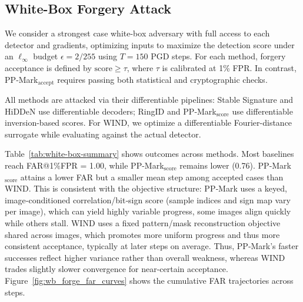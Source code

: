 \documentclass{article}
\theoremstyle{plain}
\theoremstyle{definition}
\theoremstyle{remark}
\begin{document}
\subsection{White-Box Forgery Attack}
We consider a strongest case white-box adversary with full access to each detector and
gradients, optimizing inputs to maximize the detection score under an $\ell_\infty$ budget $\epsilon=2/255$ using $T=150$ PGD steps. For each method, forgery acceptance is defined by $\mathrm{score}\ge\tau$, where $\tau$ is calibrated at 1\% FPR. In contrast, PP‑Mark$_{\mathrm{accept}}$ requires passing both statistical and cryptographic checks. 

All methods are attacked via their differentiable pipelines: Stable Signature and HiDDeN use differentiable decoders; RingID and PP‑Mark$_{\mathrm{score}}$ use differentiable inversion-based scores. For WIND, we optimize a differentiable Fourier-distance surrogate while evaluating against the actual detector. 

Table~\ref{tab:white-box-summary} shows outcomes across methods. Most baselines reach FAR@1\%FPR = 1.00, while PP-Mark$_{\mathrm{score}}$ remains lower (0.76).  PP‑Mark$_{\mathrm{score}}$ attains a lower FAR but a smaller mean step among accepted cases
than WIND. This is consistent with the objective structure: PP‑Mark uses a keyed, image‑conditioned correlation/bit‑sign score (sample indices and sign map vary per image), which can yield highly variable progress, some images align quickly while others stall. WIND uses a fixed pattern/mask reconstruction objective shared across images, which promotes more uniform progress and thus more consistent acceptance, typically at later steps on average. Thus, PP‑Mark’s faster successes reflect higher variance rather than overall weakness, whereas WIND trades slightly slower convergence for near‑certain acceptance. Figure~\ref{fig:wb_forge_far_curves} shows the cumulative FAR trajectories across steps. 
  
\end{document}

